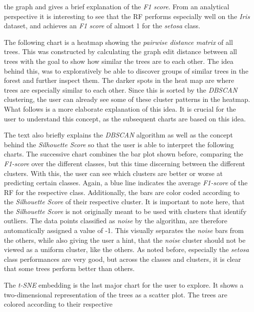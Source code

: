 \documentclass[a4paper, 12pt]{article}
\begin{document}
the graph and gives a brief explanation of the \textit{F1 score}.
From an analytical perspective it is interesting to see that the RF performs especially well on the
\textit{Iris} dataset, and achieves an \textit{F1 score} of almost 1 for the \textit{setosa} class.
\par
The following chart is a heatmap showing the \textit{pairwise distance matrix} of all trees.
This was constructed by calculating the graph edit distance between all trees with the goal to show
how similar the trees are to each other. The idea behind this, was to exploratively be able to discover
groups of similar trees in the forest and further inspect them. The darker spots in the heat map are
where trees are especially similar to each other. Since this is sorted by the \textit{DBSCAN} clustering,
the user can already see some of these cluster patterns in the heatmap. What follows is a more
elaborate explanation of this idea. It is crucial for the user to understand this concept, as the
subsequent charts are based on this idea. \par
The text also briefly explains the \textit{DBSCAN} algorithm as well as the concept behind the
\textit{Silhouette Score} so that the user is able to interpret the following charts.
The successive chart combines the bar plot shown before, comparing the \textit{F1-score} over the
different classes, but this time discerning between the different clusters. With this, the user can
see which clusters are better or worse at predicting certain classes. Again, a blue line indicates
the average \textit{F1-score} of the RF for the respective class. Additionally, the bars are color
coded according to the \textit{Silhouette Score} of their respective cluster.
It is important to note here, that the \textit{Silhouette Score} is not originally meant to be used
with clusters that identify outliers. The data points classified as \textit{noise} by the algorithm,
are therefore automatically assigned a value of -1. This visually separates the \textit{noise} bars
from the others, while also giving the user a hint, that the \textit{noise} cluster should not be
viewed as a uniform cluster, like the others.
As noted before, especially the \textit{setosa} class performances are very good, but across the
classes and clusters, it is clear that some trees perform better than others.
\par
The \textit{t-SNE} embedding is the last major chart for the user to explore. It shows a two-dimensional
representation of the trees as a scatter plot. The trees are colored according to their respective
\end{document}
